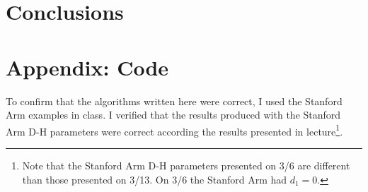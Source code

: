 \documentclass{article}
\begin{document}
\section{Conclusions}




\clearpage
\appendix
\section{Appendix: Code}
To confirm that the algorithms written here were correct, I used the Stanford Arm examples in class.
I verified that the results produced with the Stanford Arm D-H parameters were correct according the results presented in lecture\footnote{Note that the Stanford Arm D-H parameters presented on 3/6 are different than those presented on 3/13.
On 3/6 the Stanford Arm had $d_1=0$.}.

\end{document}
